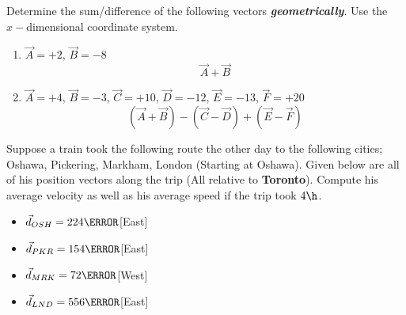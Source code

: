 \documentclass[12pt]{article} %
\begin{document}
\begin{qstn}[5]
	Determine the sum/difference of the following vectors \textbf{\emph{geometrically}}. Use the $x-$dimensional coordinate system.
	\begin{enumerate}[label=(\alph*)]
		\item $\vec A = +2$, $\vec B = -8$ $$\vec A + \vec B$$
		\vspace*{3cm}
		\item $\vec A = +4$, $\vec B = -3$, $\vec C = +10$, $\vec D = -12$, $\vec E = -13$, $\vec F = +20$   $$(\vec A + \vec B) - (\vec C - \vec D) + (\vec E - \vec F)$$

	\end{enumerate}
\end{qstn}




\begin{qstn}[6]
	Suppose a train took the following route the other day to the following cities; Oshawa, Pickering, Markham, London (Starting at Oshawa). Given below are all of his position vectors along the trip (All relative to \textbf{Toronto}). Compute his average velocity as well as his average speed if the trip took $4 \h$.
	\begin{itemize}
	\item $\vec d_{OSH} = 224\km$[East]
	\item $\vec d_{PKR} = 154\km$[East]
	\item $\vec d_{MRK} = 72\km$[West]
	\item $\vec d_{LND} = 556\km$[East]
	\end{itemize}

\end{qstn}

\end{document}
